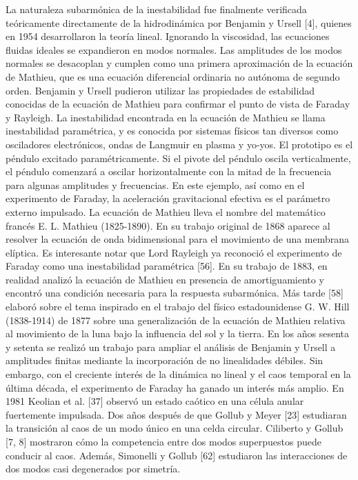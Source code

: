 La naturaleza subarmónica de la inestabilidad fue finalmente verificada teóricamente directamente de la hidrodinámica por Benjamin y Ursell [4], quienes en 1954 desarrollaron la teoría lineal. Ignorando la viscosidad, las ecuaciones fluidas ideales se expandieron en modos normales. Las amplitudes de los modos normales se desacoplan y cumplen como una primera aproximación de la ecuación de Mathieu, que es una ecuación diferencial ordinaria no autónoma de segundo orden. Benjamin y Ursell pudieron utilizar las propiedades de estabilidad conocidas de la ecuación de Mathieu para confirmar el punto de vista de Faraday y Rayleigh.
La inestabilidad encontrada en la ecuación de Mathieu se llama inestabilidad paramétrica, y es conocida por sistemas físicos tan diversos como osciladores electrónicos, ondas de Langmuir en plasma y yo-yos. El prototipo es el péndulo excitado paramétricamente. Si el pivote del péndulo oscila verticalmente, el péndulo comenzará a oscilar horizontalmente con la mitad de la frecuencia para algunas amplitudes y frecuencias. En este ejemplo, así como en el experimento de Faraday, la aceleración gravitacional efectiva es el parámetro externo impulsado. La ecuación de Mathieu lleva el nombre del matemático francés E. L. Mathieu (1825-1890). En su trabajo original de 1868 aparece al resolver la ecuación de onda bidimensional para el movimiento de una membrana elíptica.
Es interesante notar que Lord Rayleigh ya reconoció el experimento de Faraday como una inestabilidad paramétrica [56]. En su trabajo de 1883, en realidad analizó la ecuación de Mathieu en presencia de amortiguamiento y encontró una condición necesaria para la respuesta subarmónica. Más tarde [58] elaboró sobre el tema inspirado en el trabajo del físico estadounidense G. W. Hill (1838-1914) de 1877 sobre una generalización de la ecuación de Mathieu relativa al movimiento de la luna bajo la influencia del sol y la tierra.
En los años sesenta y setenta se realizó un trabajo para ampliar el análisis de Benjamin y Ursell a amplitudes finitas mediante la incorporación de no linealidades débiles. Sin embargo, con el creciente interés de la dinámica no lineal y el caos temporal en la última década, el experimento de Faraday ha ganado un interés más amplio. En 1981 Keolian et al. [37] observó un estado caótico en una célula anular fuertemente impulsada. Dos años después de que Gollub y Meyer [23] estudiaran la transición al caos de un modo único en una celda circular. Ciliberto y Gollub [7, 8] mostraron cómo la competencia entre dos modos superpuestos puede conducir al caos. Además, Simonelli y Gollub [62] estudiaron las interacciones de dos modos casi degenerados por simetría.

